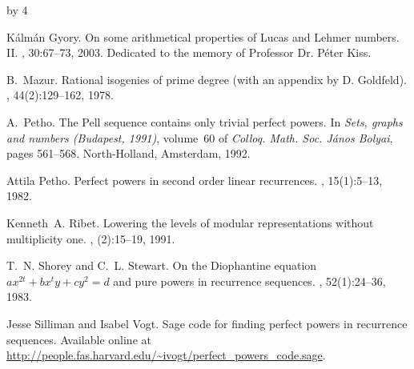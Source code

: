 \documentclass[12pt]{scrartcl}
\def\anzspalten{4}
\newlength{\kastenwidth}
\newenvironment{kasten}{%
  \begin{lrbox}{\dummybox}%
    \begin{minipage}{0.96\linewidth}}%
    {\end{minipage}%
  \end{lrbox}%
  \raisebox{-\depth}{\psshadowbox[framesep=1em]{\usebox{\dummybox}}}\\[0.5em]}
\newenvironment{spalte}{%
  \setlength\kastenwidth{1.2\textwidth}
  \divide\kastenwidth by \anzspalten
  \begin{minipage}[t]{\kastenwidth}}{\end{minipage}\hfill}
\begin{document}
\begin{lrbox}{\spalten}
{\begin{spalte}
\begin{kasten}
{\begin{thebibliography}{10}


K{\'a}lm{\'a}n Gyory.
\newblock On some arithmetical properties of {L}ucas and {L}ehmer numbers.
  {II}.
, 30:67--73,
  2003.
\newblock Dedicated to the memory of Professor Dr. P{\'e}ter Kiss.

B.~Mazur.
\newblock Rational isogenies of prime degree (with an appendix by {D}.
  {G}oldfeld).
, 44(2):129--162, 1978.


A.~Petho.
\newblock The {P}ell sequence contains only trivial perfect powers.
\newblock In {\em Sets, graphs and numbers ({B}udapest, 1991)}, volume~60 of
  {\em Colloq. Math. Soc. J\'anos Bolyai}, pages 561--568. North-Holland,
  Amsterdam, 1992.

Attila Petho.
\newblock Perfect powers in second order linear recurrences.
, 15(1):5--13, 1982.

Kenneth~A. Ribet.
\newblock Lowering the levels of modular representations without multiplicity
  one.
, (2):15--19, 1991.


T.~N. Shorey and C.~L. Stewart.
\newblock On the {D}iophantine equation {$ax^{2t}+bx^{t}y+cy^{2}=d$} and pure
  powers in recurrence sequences.
, 52(1):24--36, 1983.

Jesse Silliman and Isabel Vogt.
\newblock Sage code for finding perfect powers in recurrence sequences.
\newblock Available online at
  \url{http://people.fas.harvard.edu/~ivogt/perfect_powers_code.sage}.


\end{thebibliography}}
\end{kasten}
\end{spalte}}
\end{lrbox}
\end{document}
